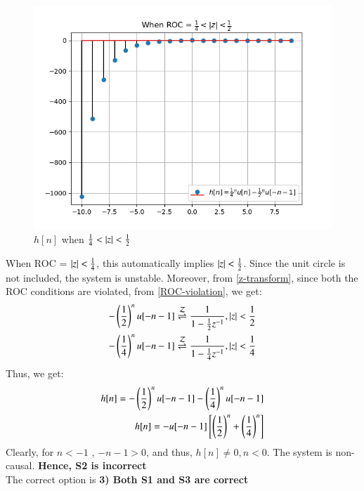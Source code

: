 \documentclass[journal,12pt,twocolumn]{IEEEtran}
\begin{document}
   \begin{figure}[!ht]
\centering
 \includegraphics[width=\columnwidth]{Graphs/S3.png}
 \caption{$h[n]$ when $\frac{1}{4}<\left\vert z\right\vert < \frac{1}{2}$}
 \end{figure}

When ROC = $\left\vert z\right\vert < \frac{1}{4}$, this automatically implies $\left\vert z\right\vert < \frac{1}{2}$. Since the unit circle is not included, the system is unstable. Moreover, from \eqref{z-transform}, since both the ROC conditions are violated, from \eqref{ROC-violation}, we get:
\begin{align}
    -\left(\frac{1}{2}\right)^nu[-n-1] \overset{\mathcal{Z}}{ \rightleftharpoons} \frac{1}{1 - \frac{1}{2}z^{-1}} , \left\vert z\right\vert < \frac{1}{2}\\
    -\left(\frac{1}{4}\right)^nu[-n-1] \overset{\mathcal{Z}}{ \rightleftharpoons} \frac{1}{1 - \frac{1}{4}z^{-1}} , \left\vert z\right\vert < \frac{1}{4}
\end{align}
Thus, we get:
\begin{align}
    h[n] = -\left(\frac{1}{2}\right)^nu[-n-1] -\left(\frac{1}{4}\right)^nu[-n-1]\\
    h[n] = -u[-n-1]{}\left[\left(\frac{1}{2}\right)^n + \left(\frac{1}{4}\right)^n\right]
\end{align}
Clearly, for $n<-1$ , $-n-1 > 0$, and thus, $h[n] \neq 0 , n<0$. The system is non-causal.
\textbf{Hence, S2 is incorrect}\\
 The correct option is \textbf{3) Both S1 and S3 are correct}
\end{document}
